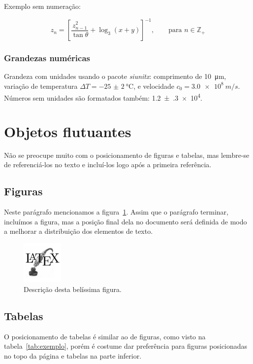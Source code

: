 \documentclass[a4paper,11pt]{article}
\begin{document}
Exemplo sem numeração:

\begin{equation*}
z_n = \left[\frac{z_{n-1}^2}{\tan\theta} + \log_3(x + y)\right]^{-1},\qquad\text{para } n \in \mathbb{Z}_+
\end{equation*}


\subsubsection{Grandezas numéricas}

Grandeza com unidades usando o pacote \emph{siunitx}: comprimento de \SI{10}{\micro m}, variação de temperatura $\Delta T = \SI{-25(2)}{\celsius}$, e velocidade $c_0 = \SI{3.0e8}{m/s}$.
Números sem unidades são formatados também: \num{1.2(3)e4}.


\section{Objetos flutuantes}

Não se preocupe muito com o posicionamento de figuras e tabelas, mas lembre-se de referenciá-los no texto e incluí-los logo após a primeira referência.


\subsection{Figuras}

Neste parágrafo mencionamos a figura~\ref{fig:exemplo}.
Assim que o parágrafo terminar, incluímos a figura, mas a posição final dela no documento será definida de modo a melhorar a distribuição dos elementos de texto.

\begin{figure}[htpb]
\centering
\includegraphics[width=2cm]{exemplo}
\caption{Descrição desta belíssima figura.}
\label{fig:exemplo}
\end{figure}


\subsection{Tabelas}

O posicionamento de tabelas é similar ao de figuras, como visto na tabela~\ref{tab:exemplo}, porém é costume dar preferência para figuras posicionadas no topo da página e tabelas na parte inferior.
\end{document}
